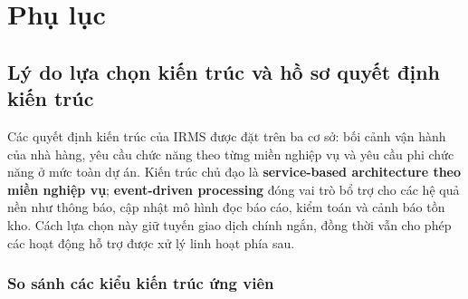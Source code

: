 
\appendix
\section{Phụ lục}
\label{appendix:overall}

\subsection{Lý do lựa chọn kiến trúc và hồ sơ quyết định kiến trúc}\label{appendix:architecture-rationale}

Các quyết định kiến trúc của IRMS được đặt trên ba cơ sở: bối cảnh vận hành của nhà hàng, yêu cầu chức năng theo từng miền nghiệp vụ và yêu cầu phi chức năng ở mức toàn dự án. Kiến trúc chủ đạo là \textbf{service-based architecture theo miền nghiệp vụ}; \textbf{event-driven processing} đóng vai trò bổ trợ cho các hệ quả nền như thông báo, cập nhật mô hình đọc báo cáo, kiểm toán và cảnh báo tồn kho. Cách lựa chọn này giữ tuyến giao dịch chính ngắn, đồng thời vẫn cho phép các hoạt động hỗ trợ được xử lý linh hoạt phía sau.

\subsubsection{So sánh các kiểu kiến trúc ứng viên}

